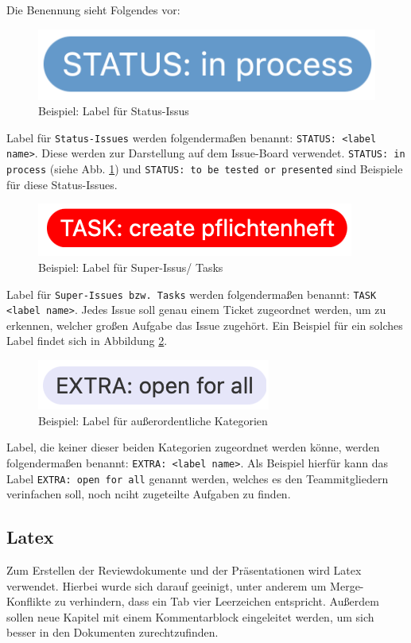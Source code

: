 \documentclass[../review_3.tex]{subfiles}
\begin{document}
Die Benennung sieht Folgendes vor:

\begin{figure} [h]
    \centering
    \includegraphics[width = 0.2\linewidth]{img/status.png}
    \caption{Beispiel: Label für Status-Issus}
    \label{status}
\end{figure}
Label für \texttt{Status-Issues} werden folgendermaßen benannt: \texttt{STATUS: <label name>}. Diese werden zur Darstellung auf dem Issue-Board verwendet. \texttt{STATUS: in process} (siehe Abb. \ref{status}) und \texttt{STATUS: to be tested or presented} sind Beispiele für diese Status-Issues.

\begin{figure} [h]
    \centering
    \includegraphics[width = 0.26\linewidth]{img/task.png}
    \caption{Beispiel: Label für Super-Issus/ Tasks}
    \label{task}
\end{figure}
Label für \texttt{Super-Issues bzw. Tasks} werden folgendermaßen benannt: \texttt{TASK <label name>}. Jedes Issue soll genau einem Ticket zugeordnet werden, um zu erkennen, welcher großen Aufgabe das Issue zugehört. Ein Beispiel für ein solches Label findet sich in Abbildung \ref{task}.

\begin{figure} [h]
    \centering
    \includegraphics[width = 0.23\linewidth]{img/extra.png}
    \caption{Beispiel: Label für außerordentliche Kategorien}
    \label{extra}
\end{figure}
Label, die keiner dieser beiden Kategorien zugeordnet werden könne, werden folgendermaßen benannt: \texttt{EXTRA: <label name>}. Als Beispiel hierfür kann das Label \texttt{EXTRA: open for all} genannt werden, welches es den Teammitgliedern verinfachen soll, noch nciht zugeteilte Aufgaben zu finden.

\subsection{Latex}
Zum Erstellen der Reviewdokumente und der Präsentationen wird Latex verwendet. Hierbei wurde sich darauf geeinigt, unter anderem um Merge-Konflikte zu verhindern, dass ein Tab vier Leerzeichen entspricht. Außerdem sollen neue Kapitel mit einem Kommentarblock eingeleitet werden, um sich besser in den Dokumenten zurechtzufinden.
\end{document}
